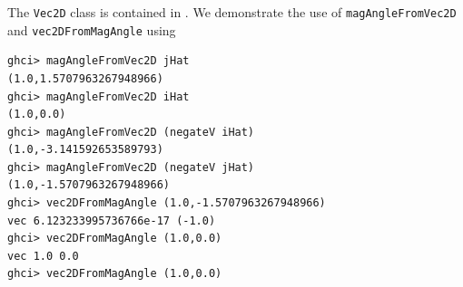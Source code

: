 The \verb|Vec2D| class is contained in .
We demonstrate the use of \verb|magAngleFromVec2D| and \verb|vec2DFromMagAngle| using

\begin{lstlisting}
ghci> magAngleFromVec2D jHat
(1.0,1.5707963267948966)
ghci> magAngleFromVec2D iHat
(1.0,0.0)
ghci> magAngleFromVec2D (negateV iHat)
(1.0,-3.141592653589793)
ghci> magAngleFromVec2D (negateV jHat)
(1.0,-1.5707963267948966)
ghci> vec2DFromMagAngle (1.0,-1.5707963267948966)
vec 6.123233995736766e-17 (-1.0) 
ghci> vec2DFromMagAngle (1.0,0.0)
vec 1.0 0.0 
ghci> vec2DFromMagAngle (1.0,0.0)
\end{lstlisting}
